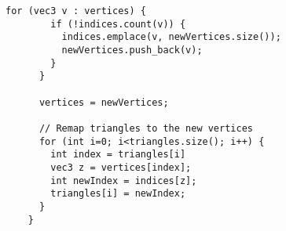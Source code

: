 \begin{subs}
\begin{minipage}{\textwidth}
\begin{lstlisting}[caption={Removing duplicates}, label={lst:remove_duplicates}]
      for (vec3 v : vertices) {
        if (!indices.count(v)) {
          indices.emplace(v, newVertices.size());
          newVertices.push_back(v);
        }
      }

      vertices = newVertices;

      // Remap triangles to the new vertices
      for (int i=0; i<triangles.size(); i++) {
        int index = triangles[i]
        vec3 z = vertices[index];
        int newIndex = indices[z];
        triangles[i] = newIndex;
      }
    }
\end{lstlisting}
\end{minipage}

\iffalse
\begin{minipage}{\textwidth}
  \begin{lstlisting}[caption={Removing duplicates}, label={lst:remove_duplicates}]
    void removeDuplicates(vector<vec3>& vertices,
                          vector<vec2>& texCoords,
                          vector<int>& triangles) {
                            
      unordered_map<vec3, vector<int>> indices;
      unordered_map<int, int> old_to_new;
      
      vector<vec3> newVertices;
      vector<vec2> newTexCoords;
      
      for (int i=0; i<vertices.size(); i++) {
        vec3 v = vertices[i];
        vec2 t = texCoords[i];
        
        if (!indices.count(v)) {
          vector<int> vec{newVertices.size()};
          indices.emplace(v, vec);
          oldToNew.emplace(i, newVertices.size());
          
          newVertices.push_back(v);
          newTexCoords.push_back(t);
          
        } else {
          vector<int> vec = indices[i];
          
          if (uniqueTexCoord(i, vec)) {
            indices[v].push_back(newVertices.size());
            oldToNew.emplace(i, newVertices.size());
            
            newVertices.push_back(v);
            newTexCoords.push_back(t);
          }
        }
      }

      vertices = newVertices;
      texCoords = newTexCoords;

      // Remap triangles to the new vertices
      for (int i=0; i<triangles.size(); i++) {
        int index = triangles[i];
        triangles[i] = oldToNew[index];
      }
    }
\end{lstlisting}
\end{minipage}
\fi
\end{subs}

